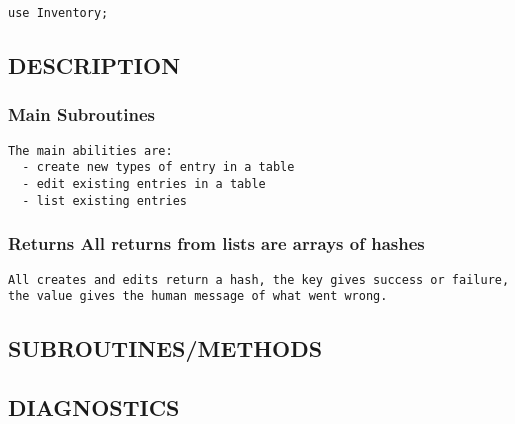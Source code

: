 \documentclass{book}
\begin{document}
\begin{Verbatim}[fontfamily=courier,gobble=1,frame=lines,fontsize=\small]
  use Inventory;
\end{Verbatim}


\subsection{DESCRIPTION}
\label{Inventory_DESCRIPTION}
\hypertarget{Inventory_DESCRIPTION}{}


\subsubsection{Main Subroutines}
\label{Inventory_Main_Subroutines}
\hypertarget{Inventory_Main_Subroutines}{}


\begin{Verbatim}[fontfamily=courier,gobble=1,frame=lines,fontsize=\small]
 The main abilities are:
  - create new types of entry in a table
  - edit existing entries in a table
  - list existing entries
\end{Verbatim}


\subsubsection{Returns All returns from lists are arrays of hashes}
\label{Inventory_Returns_All_returns_from_lists_are_arrays_of_hashes}
\hypertarget{Inventory_Returns_All_returns_from_lists_are_arrays_of_hashes}{}


\begin{lstlisting}[frame=lines,gobble=1]
 All creates and edits return a hash, the key gives success or failure, the value gives the human message of what went wrong.
\end{lstlisting}


\subsection{SUBROUTINES/METHODS}
\label{Inventory_SUBROUTINES_METHODS}
\hypertarget{Inventory_SUBROUTINES_METHODS}{}


\subsection{DIAGNOSTICS}
\label{Inventory_DIAGNOSTICS}
\hypertarget{Inventory_DIAGNOSTICS}{}
\end{document}
